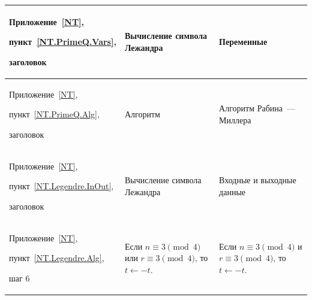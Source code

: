 {\begin{center}
\begin{longtable}{|p{3.5cm}|p{6.0cm}|p{6.0cm}|}
\\
%
\hline
Приложение~\ref{NT},\par
пункт~\ref{NT.PrimeQ.Vars},\par
заголовок 
&
Вычисление символа Лежандра
&
Переменные
\\
%
\hline
Приложение~\ref{NT},\par
пункт~\ref{NT.PrimeQ.Alg},\par
заголовок 
&
Алгоритм
&
Алгоритм Рабина~--- Миллера
\\
%
\hline
Приложение~\ref{NT},\par
пункт~\ref{NT.Legendre.InOut},\par
заголовок 
& 
Вычисление символа Лежандра
&
Входные и выходные данные
\\
%
\hline
Приложение~\ref{NT},\par
пункт~\ref{NT.Legendre.Alg},\par
шаг 6 
& 
Если $n\equiv 3\pmod{4}$ или $r\equiv 3\pmod{4}$, 
то $t\leftarrow -t$.
&
Если $n\equiv 3\pmod{4}$ и $r\equiv 3\pmod{4}$, 
то $t\leftarrow -t$.
\\
%
\hline
\end{longtable}
\end{center}
}

\thispagestyle{headings}

\mbox{}